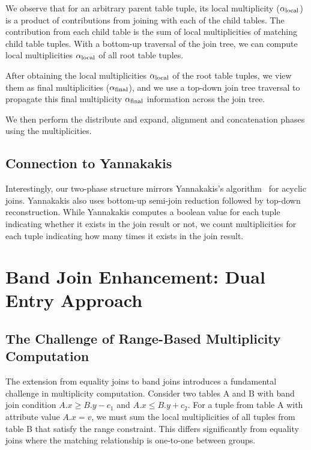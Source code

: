 We observe that for an arbitrary parent table tuple, its local multiplicity ($\alpha_{\text{local}}$) is a product of contributions from joining with each of the child tables. The contribution from each child table is the sum of local multiplicities of matching child table tuples. With a bottom-up traversal of the join tree, we can compute local multiplicities $\alpha_{\text{local}}$ of all root table tuples.

After obtaining the local multiplicities $\alpha_{\text{local}}$ of the root table tuples, we view them as final multiplicities ($\alpha_{\text{final}}$), and we use a top-down join tree traversal to propagate this final multiplicity $\alpha_{\text{final}}$ information across the join tree.

We then perform the distribute and expand, alignment and concatenation phases using the multiplicities.

\subsection{Connection to Yannakakis}

Interestingly, our two-phase structure mirrors Yannakakis's algorithm~\cite{yannakakis1981} for acyclic joins. Yannakakis also uses bottom-up semi-join reduction followed by top-down reconstruction. While Yannakakis computes a boolean value for each tuple indicating whether it exists in the join result or not, we count multiplicities for each tuple indicating how many times it exists in the join result.

\section{Band Join Enhancement: Dual Entry Approach}

\subsection{The Challenge of Range-Based Multiplicity Computation}

The extension from equality joins to band joins introduces a fundamental challenge in multiplicity computation. Consider two tables A and B with band join condition $A.x \geq B.y - c_1$ and $A.x \leq B.y + c_2$. For a tuple from table A with attribute value $A.x = v$, we must sum the local multiplicities of all tuples from table B that satisfy the range constraint. This differs significantly from equality joins where the matching relationship is one-to-one between groups.

